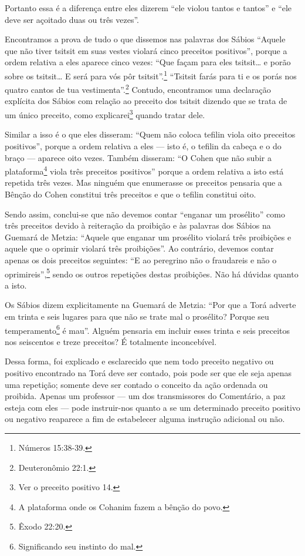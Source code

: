 Portanto essa é a diferença entre eles dizerem ``ele violou tantos e
tantos'' e ``ele deve ser açoitado duas ou três vezes''.

Encontramos a prova de tudo o que dissemos nas palavras dos Sábios
``Aquele que não tiver tsitsit em suas vestes violará cinco preceitos
positivos'', porque a ordem relativa a eles aparece cinco vezes: ``Que
façam para eles tsitsit\ldots{} e porão sobre os tsitsit\ldots{} E será para
vós pôr tsitsit''.\footnote{Números 15:38-39.} ``Tsitsit farás para ti e os
porás nos quatro cantos de tua vestimenta''.\footnote{Deuteronômio 22:1.} Contudo,
encontramos uma declaração explícita dos Sábios com relação ao preceito
dos tsitsit dizendo que se trata de um único preceito, como
explicarei\footnote{Ver o preceito positivo 14.} quando tratar dele.


Similar a isso é o que eles disseram: ``Quem não coloca tefilin viola oito preceitos positivos'', porque a ordem relativa a eles --- isto
é, o tefilin da cabeça e o do braço --- aparece oito vezes. Também disseram:
``O Cohen que não subir a plataforma\footnote{A plataforma onde os Cohanim fazem a bênção do povo.} viola três
preceitos positivos'' porque a ordem relativa a isto está repetida três vezes. Mas ninguém que enumerasse os
preceitos pensaria que a Bênção do Cohen constitui três preceitos e
que o tefilin constitui oito.

Sendo assim, conclui-se que não devemos contar ``enganar um prosélito''
como três preceitos devido à reiteração da proibição e às palavras dos
Sábios na Guemará de Metzia: ``Aquele que enganar um prosélito violará
três proibições e aquele que o oprimir violará três proibições''. Ao
contrário, devemos contar apenas os dois preceitos seguintes: ``E ao
peregrino não o fraudareis e não o oprimireis'',\footnote{Êxodo 22:20.} sendo os
outros repetições destas proibições. Não há dúvidas quanto a isto.

Os Sábios dizem explicitamente na Guemará de Metzia: ``Por que a
Torá adverte em trinta e seis lugares para que não se trate mal o
prosélito?
Porque seu temperamento\footnote{Significando seu instinto do mal.} é mau''. Alguém pensaria em incluir esses trinta e seis preceitos nos seiscentos e treze preceitos? É totalmente inconcebível.



Dessa forma, foi explicado e esclarecido que nem todo preceito negativo
ou positivo encontrado na Torá deve ser contado, pois pode ser que ele
seja apenas uma repetição; somente deve ser contado o conceito da ação
ordenada ou proibida. Apenas um professor --- um dos transmissores do
Comentário, a paz esteja com eles --- pode instruir-nos quanto a se um
determinado preceito positivo ou negativo reaparece a fim de
estabelecer alguma instrução adicional ou não.

